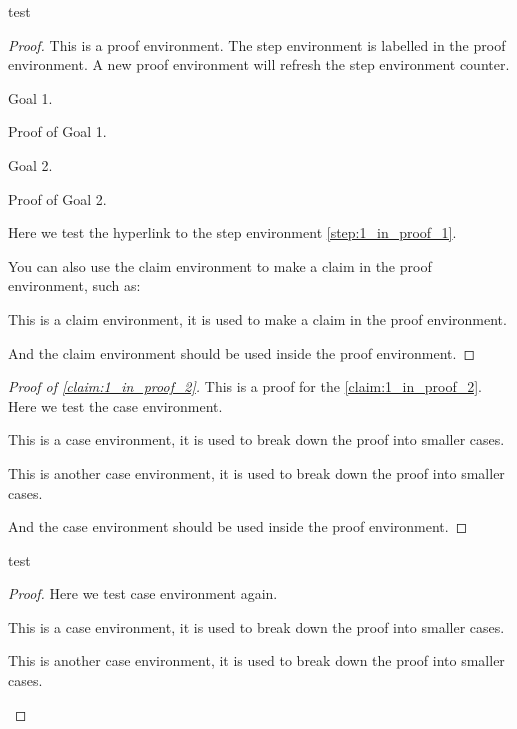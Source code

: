     \begin{theorem}
        test 
    \end{theorem}
    \begin{proof}
        This is a proof environment.
        The step environment is labelled in the proof environment.
        A new proof environment will refresh the step environment counter.
        \begin{step}\label{step:1_in_proof_2}
            Goal 1.
        \end{step}
        Proof of Goal 1.
        
        \begin{step}\label{step:2_in_proof_2}
            Goal 2.
        \end{step}
        Proof of Goal 2.

        Here we test the hyperlink to the step environment \cref{step:1_in_proof_1}.

        You can also use the claim environment to make a claim in the proof environment, such as:
        \begin{claim}\label{claim:1_in_proof_2}
            This is a claim environment, it is used to make a claim in the proof environment.
        \end{claim}
        And the claim environment should be used inside the proof environment.
    \end{proof}
    \begin{proof}[Proof of \cref{claim:1_in_proof_2}]
        This is a proof for the \cref{claim:1_in_proof_2}.
        Here we test the case environment.
        \begin{case}\label{case:1_in_proof_2}
            This is a case environment, it is used to break down the proof into smaller cases.
        \end{case}
        \begin{case}\label{case:2_in_proof_2}
            This is another case environment, it is used to break down the proof into smaller cases.
        \end{case}
        And the case environment should be used inside the proof environment.
    \end{proof}

    \begin{lemma}
        test
    \end{lemma}
    \begin{proof}
        Here we test case environment again.
        \begin{case}\label{case:1_in_proof_3} 
            This is a case environment, it is used to break down the proof into smaller cases.
        \end{case}
        \begin{case}\label{case:2_in_proof_3}
            This is another case environment, it is used to break down the proof into smaller cases.
        \end{case}
    \end{proof}


